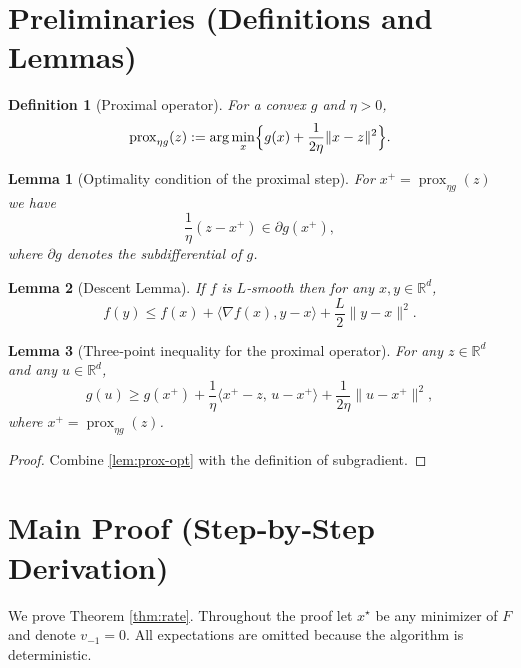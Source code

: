 \documentclass{article}
\newtheorem{lemma}{Lemma}
\newtheorem{definition}{Definition}
\newcommand{\prox}{\operatorname{prox}}
\newcommand{\grad}{\nabla}
\newcommand{\R}{\mathbb{R}}
\begin{document}
\section*{Preliminaries (Definitions and Lemmas)}
\begin{definition}[Proximal operator]
For a convex $g$ and $\eta>0$, 
\[
\prox_{\eta g}(z):=\arg\min_{x}\Bigl\{ g(x)+\frac{1}{2\eta}\|x-z\|^{2}\Bigr\}.
\]
\end{definition}
\begin{lemma}[Optimality condition of the proximal step]\label{lem:prox-opt}
For $x^{+}= \prox_{\eta g}(z)$ we have
\[
\frac{1}{\eta}(z-x^{+})\in \partial g(x^{+}),
\tag{4}
\]
where $\partial g$ denotes the subdifferential of $g$.
\end{lemma}
\begin{lemma}[Descent Lemma]\label{lem:descent}
If $f$ is $L$‑smooth then for any $x,y\in\R^{d}$,
\[
f(y)\le f(x)+\langle\grad f(x),y-x\rangle+\frac{L}{2}\|y-x\|^{2}.
\tag{5}
\]
\end{lemma}
\begin{lemma}[Three‑point inequality for the proximal operator]\label{lem:three-point}
For any $z\in\R^{d}$ and any $u\in\R^{d}$,
\[
g(u)\ge g(x^{+})+\frac{1}{\eta}\langle x^{+}-z,\,u-x^{+}\rangle+\frac{1}{2\eta}\|u-x^{+}\|^{2},
\tag{6}
\]
where $x^{+}=\prox_{\eta g}(z)$.
\end{lemma}
\begin{proof}
Combine \eqref{lem:prox-opt} with the definition of subgradient.
\end{proof}

\section*{Main Proof (Step‑by‑Step Derivation)}
We prove Theorem \ref{thm:rate}.  Throughout the proof let $x^\star$ be any minimizer of $F$ and denote $v_{-1}=0$.  All expectations are omitted because the algorithm is deterministic.
\end{document}
